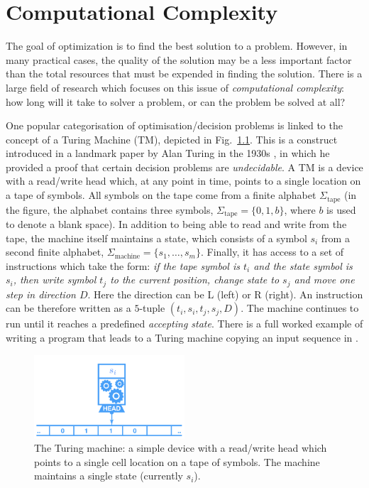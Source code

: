 \chapter{Computational Complexity} \label{chap:computational-complexity}

The goal of optimization is to find the best solution to a problem.  However, in many practical cases, the quality of the solution may be a less important factor than the total resources that must be expended in finding the solution.   There is a large field of research which focuses on this issue of \textit{computational complexity}: how long will it take to solver a problem, or can the problem be solved at all?

One popular categorisation of optimisation/decision problems is linked to the concept of a Turing Machine (TM), depicted in Fig.~\ref{fig:TM}. This is a  construct introduced in a landmark paper by Alan Turing in the 1930s \cite{turing1937computable}, in which he provided a proof that certain decision problems are \textit{undecidable}.  A TM is a device with a read/write head which, at any point in time, points to a single location on a tape of symbols.  All symbols on the tape come from a finite alphabet $\Sigma_{\text{tape}}$ (in the figure, the alphabet contains three symbols, $\Sigma_{\text{tape}} = \{0, 1, b\}$, where $b$ is used to denote a blank space).  In addition to being able to read and write from the tape, the machine itself maintains a state, which consists of a symbol $s_i$ from a second finite alphabet, $\Sigma_{\text{machine}} = \{s_1, \dots, s_m\}$. Finally, it has access to a set of instructions which take the form: \textit{if the tape symbol is $t_i$ and the state symbol is $s_i$, then write symbol $t_j$ to the current position, change state to $s_j$ and move one step in direction $D$}.  Here the direction can be L (left) or R (right).  An instruction can be therefore written as a $5$-tuple $(t_i, s_i, t_j, s_j, D)$.  The machine continues to run until it reaches a predefined \textit{accepting state}. There is a full worked example of writing a program that leads to a Turing machine copying an input sequence in \cite{turingMachines}.



\begin{figure}
\centering
\includegraphics[width=0.5\textwidth]{figs/turing-machine-fig-001.png}
\caption{The Turing machine: a simple device with a read/write head which points to a single cell location on a tape of symbols.  The machine maintains a single state (currently $s_i$). \label{fig:TM}}	
\end{figure}

